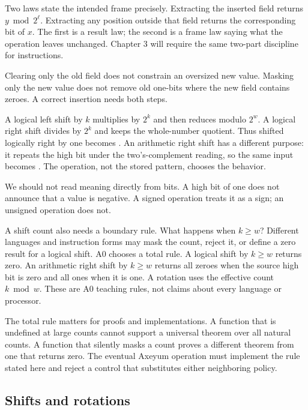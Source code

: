 Two laws state the intended frame precisely. Extracting the inserted field
returns \(y\bmod2^\ell\). Extracting any position outside that field returns
the corresponding bit of \(x\). The first is a result law; the second is a
frame law saying what the operation leaves unchanged. Chapter 3 will require
the same two-part discipline for instructions.

\begin{warning}[title={Clearing and masking do different work}]
Clearing only the old field does not constrain an oversized new value.
Masking only the new value does not remove old one-bits where the new field
contains zeroes. A correct insertion needs both steps.
\end{warning}

A logical left shift by \(k\) multiplies by \(2^k\) and then reduces modulo
\(2^w\). A logical right shift divides by \(2^k\) and keeps the whole-number
quotient. Thus  shifted logically right by one becomes
. An arithmetic right shift has a different purpose: it repeats the
high bit under the two's-complement reading, so the same input becomes
. The operation, not the stored pattern, chooses the behavior.

We should not read meaning directly from bits. A high
bit of one does not announce that a value is negative. A signed operation
treats it as a sign; an unsigned operation does not.

A shift count also needs a boundary rule. What happens when \(k\geq w\)?
Different languages and instruction forms may mask the count, reject it, or
define a zero result for a logical shift. A0 chooses a total rule. A logical
shift by \(k\geq w\) returns zero. An arithmetic right shift by \(k\geq w\)
returns all zeroes when the source high bit is zero and all ones when it is
one. A rotation uses the effective count \(k\bmod w\). These are A0 teaching
rules, not claims about every language or processor.

The total rule matters for proofs and implementations. A function that is
undefined at large counts cannot support a universal theorem over all natural
counts. A function that silently masks a count proves a different theorem
from one that returns zero. The eventual Axeyum operation must implement the
rule stated here and reject a control that substitutes either neighboring
policy.

\subsection{Shifts and rotations}

